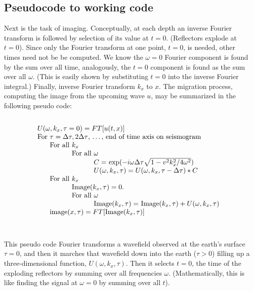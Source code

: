 \subsection{Pseudocode to working code}
Next is the task of imaging.
Conceptually, at each depth an inverse Fourier transform is followed
by selection of its value at  $t = 0$.
(Reflectors explode at  $t=0$).
Since only the Fourier transform at one point,
$t = 0$,
is needed,
other times need not be be computed.
We know the $\omega =0$ Fourier component
is found by the sum over all time,
analogously, the $t=0$ component
is found as the sum over all $\omega$.
(This is easily shown by substituting $t=0$
into the inverse Fourier integral.)
Finally,
inverse Fourier transform  $ k_x $  to  $x$.
The migration process,
computing the image from the upcoming wave  $u$,
may be summarized in the following pseudo code:
\par\noindent
\def\eq{\quad =\quad}
$$\vbox{
\begin{tabbing}
  $U(\omega, k_x, \tau = 0) = FT[u(t, x)]$                   \\
  For \= $\tau = \Delta\tau, 2\Delta\tau$,
         \ldots, end of time axis on seismogram   \\
      \> For all \= $k_x$                        \\
      \>         \> For all \= $\omega$            \\
      \>         \>        \> $C =\ $exp$(-i\omega \Delta
            \tau \sqrt{1 - v^2 k_x^2/ 4\omega^2})$   \\
      \>         \>        \> $U(\omega, k_x, \tau) = 
                               U(\omega, k_x, \tau - \Delta\tau ) \ast C$  \\
      \> For all \= $k_x$                         \\
      \>         \> Image$ (k_x, \tau) = 0$.        \\
      \>         \> For all \= $\omega$            \\
      \>         \>        \> Image$(k_x, \tau) = \ 
                              $Image$(k_x, \tau) + U(\omega, k_x, \tau)$   \\
      \> image$(x, \tau) = FT[$Image$(k_x, \tau)]$    \\
\end{tabbing}
}$$
\par\noindent
This pseudo code Fourier transforms a wavefield
observed at the earth's surface $\tau =0$,
and then it marches that wavefield down into the earth ($\tau>0$)
filling up a three-dimensional function, $U(\omega, k_x, \tau)$.
Then it selects $t=0$, the time of the exploding reflectors
by summing over all frequencies $\omega$.
(Mathematically,
this is like
finding the signal at $\omega =0$ by summing over all $t$).

